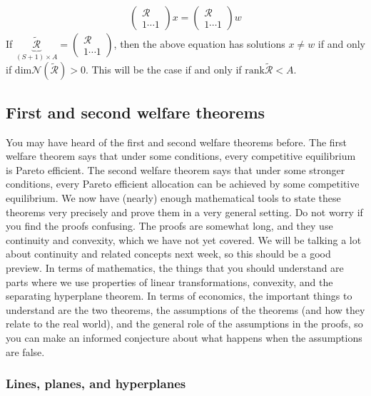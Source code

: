\documentclass[12pt,reqno]{amsart}
\theoremstyle{definition}
\newcommand{\rank}{\mathrm{rank}}
\renewcommand{\dim}{\mathrm{dim}}
\begin{document}
\begin{align*}
  \begin{pmatrix} \mathcal{R} \\ 1 \cdots 1 \end{pmatrix} x 
  = \begin{pmatrix} \mathcal{R} \\ 1 \cdots 1 \end{pmatrix} w 
\end{align*}
If $\underbrace{\widetilde{\mathcal{R}}}_{(S+1) \times A}
=   \begin{pmatrix} \mathcal{R} \\ 1 \cdots  1 \end{pmatrix} $, then
the above equation has solutions $x \neq w$ 
if and only if $\dim \mathcal{N}(\widetilde{\mathcal{R}})> 0$. This will
be the case if and only if $\rank \widetilde{\mathcal{R}} < A$. 

\subsection{First and second welfare theorems \label{sec:welfare}}

You may have heard of the first and second welfare theorems
before. The first welfare theorem says that under some conditions,
every competitive equilibrium is Pareto efficient. The second welfare
theorem says that under some stronger conditions, every Pareto
efficient allocation can be achieved by some competitive
equilibrium. We now have (nearly) enough mathematical tools to state
these theorems very precisely and prove them in a very general
setting.  Do not worry if you find the proofs confusing. The proofs
are somewhat long, and they use continuity and convexity, which we
have not yet covered. We will be talking a lot about continuity and
related concepts next week, so this should be a good preview. In terms
of mathematics, the things that you should understand are parts where
we use properties of linear transformations, convexity, and the
separating hyperplane theorem. In terms of economics, the important
things to understand are the two theorems, the assumptions of the
theorems (and how they relate to the real world), and the general role
of the assumptions in the proofs, so you can make an informed
conjecture about what happens when the assumptions are false.


\subsubsection{Lines, planes, and hyperplanes }
\end{document}
